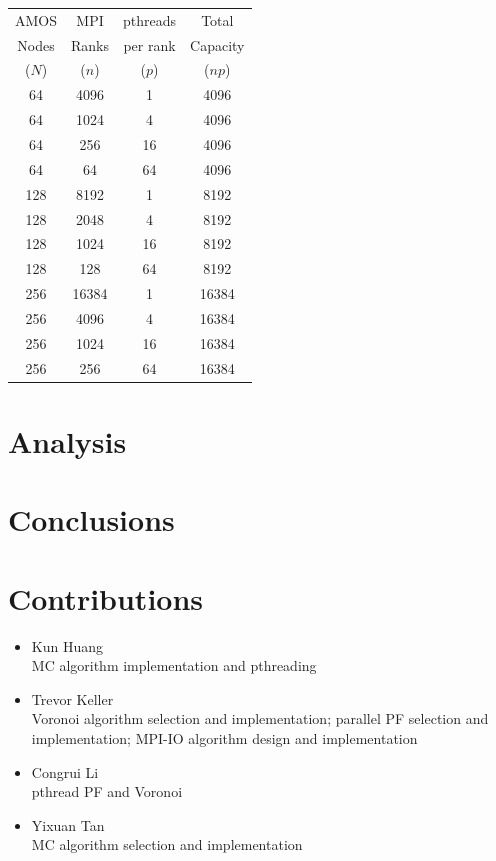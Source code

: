 \documentclass[11pt]{article}
\begin{document}
\begin{multicols*}{2}
\begin{center}
\begin{minipage}{0.45\textwidth}
\begin{tabular}{|cccc|}\hline
AMOS  	& MPI 	& pthreads & Total\\
Nodes	& Ranks & per rank & Capacity\\
($N$)	& ($n$)	& ($p$)	& ($np$)\\\hline
64	& 4096	& 1	& 4096\\
64	& 1024	& 4	& 4096\\
64	& 256	& 16	& 4096\\
64	& 64	& 64	& 4096\\\hline
128	& 8192	& 1	& 8192\\
128	& 2048	& 4	& 8192\\
128	& 1024	& 16	& 8192\\
128	& 128	& 64	& 8192\\\hline
256	& 16384	& 1	& 16384\\
256	& 4096	& 4	& 16384\\
256	& 1024	& 16	& 16384\\
256	& 256	& 64	& 16384\\
\hline
\end{tabular}
\end{minipage}
\end{center}

\section{Analysis}


\section{Conclusions}


\section{Contributions}
\begin{itemize}
 \item Kun Huang\\
	MC algorithm implementation and pthreading
 \item Trevor Keller\\
	Voronoi algorithm selection and implementation; parallel PF selection and implementation; MPI-IO algorithm design and implementation
 \item Congrui Li\\
	pthread PF and Voronoi
 \item Yixuan Tan\\
	MC algorithm selection and implementation
\end{itemize}


\end{multicols*}
\end{document}
